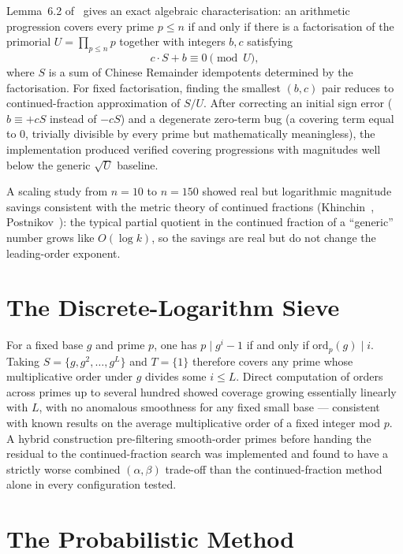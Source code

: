 \documentclass[12pt]{article}
\theoremstyle{remark}
\begin{document}
Lemma~6.2 of~\cite{umans2025} gives an exact algebraic characterisation: an
arithmetic progression covers every prime $p \le n$ if and only if there is a
factorisation of the primorial $U = \prod_{p \le n} p$ together with integers
$b, c$ satisfying
\[
  c \cdot S + b \equiv 0 \pmod{U},
\]
where $S$ is a sum of Chinese Remainder idempotents determined by the
factorisation.  For fixed factorisation, finding the smallest $(b,c)$ pair
reduces to continued-fraction approximation of $S/U$.  After correcting an
initial sign error ($b \equiv +cS$ instead of $-cS$) and a degenerate zero-term
bug (a covering term equal to $0$, trivially divisible by every prime but
mathematically meaningless), the implementation produced verified covering
progressions with magnitudes well below the generic $\sqrt{U}$ baseline.

A scaling study from $n = 10$ to $n = 150$ showed real but logarithmic
magnitude savings consistent with the metric theory of continued fractions
(Khinchin~\cite{khinchin1964}, Postnikov~\cite{postnikov1966}): the typical
partial quotient in the continued fraction of a ``generic'' number grows like
$O(\log k)$, so the savings are real but do not change the leading-order
exponent.

\section{The Discrete-Logarithm Sieve}

For a fixed base $g$ and prime $p$, one has $p \mid g^i - 1$ if and only if
$\mathrm{ord}_p(g) \mid i$.  Taking $S = \{g, g^2, \ldots, g^L\}$ and $T =
\{1\}$ therefore covers any prime whose multiplicative order under $g$ divides
some $i \le L$.  Direct computation of orders across primes up to several
hundred showed coverage growing essentially linearly with $L$, with no anomalous
smoothness for any fixed small base --- consistent with known results on the
average multiplicative order of a fixed integer mod $p$.  A hybrid construction
pre-filtering smooth-order primes before handing the residual to the
continued-fraction search was implemented and found to have a strictly worse
combined $(\alpha,\beta)$ trade-off than the continued-fraction method alone in
every configuration tested.

\section{The Probabilistic Method}
\end{document}
